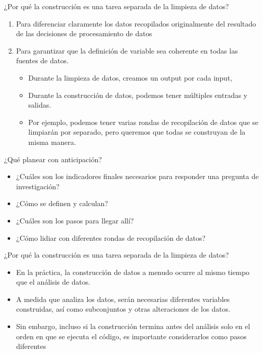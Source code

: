 \documentclass[10pt, aspectratio=169, compress]{beamer}
\begin{document}
\begin{frame}{¿Por qué la construcción es una tarea separada de la limpieza de datos?}
	\begin{enumerate}
		\item Para diferenciar claramente los datos recopilados originalmente del resultado de las decisiones de procesamiento de datos
		\item Para garantizar que la definición de variable sea coherente en todas las fuentes de datos.
		\begin{itemize}
			\item Durante la limpieza de datos, creamos un output por cada input,
			\item Durante la construcción de datos, podemos tener múltiples entradas y salidas.
			\item Por ejemplo, podemos tener varias rondas de recopilación de datos que se limpiarán por separado, pero queremos que todas se construyan de la misma manera.
		\end{itemize}
	\end{enumerate}
\end{frame}
\begin{frame}{¿Qué planear con anticipación?}
	\begin{itemize}
		\item ¿Cuáles son los indicadores finales necesarios para responder una pregunta de investigación?
		\item ¿Cómo se definen y calculan?
		\item ¿Cuáles son los pasos para llegar allí?
		\item ¿Cómo lidiar con diferentes rondas de recopilación de datos? 
	\end{itemize}
\end{frame}
\begin{frame}{¿Por qué la construcción es una tarea separada de la limpieza de datos?}
	\begin{itemize}
		\item En la práctica, la construcción de datos a menudo ocurre al mismo tiempo que el análisis de datos.
		\item A medida que analiza los datos, serán necesarias diferentes variables construidas, así como subconjuntos y otras alteraciones de los datos.
		\item Sin embargo, incluso si la construcción termina antes del análisis solo en el orden en que se ejecuta el código, es importante considerarlos como pasos diferentes
	\end{itemize}
\end{frame}
\end{document}
